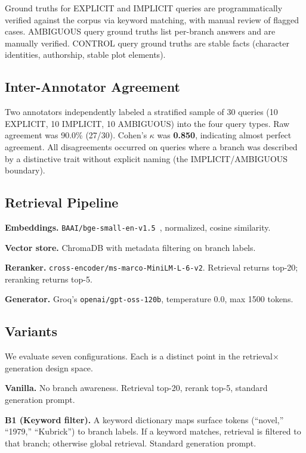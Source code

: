 \documentclass[conference]{IEEEtran}
\begin{document}
Ground truths for EXPLICIT and IMPLICIT queries are programmatically verified against the corpus via keyword matching, with manual review of flagged cases. AMBIGUOUS query ground truths list per-branch answers and are manually verified. CONTROL query ground truths are stable facts (character identities, authorship, stable plot elements).

\subsection{Inter-Annotator Agreement}

Two annotators independently labeled a stratified sample of 30 queries (10 EXPLICIT, 10 IMPLICIT, 10 AMBIGUOUS) into the four query types. Raw agreement was 90.0\% (27/30). Cohen's $\kappa$ was \textbf{0.850}, indicating almost perfect agreement. All disagreements occurred on queries where a branch was described by a distinctive trait without explicit naming (the IMPLICIT/AMBIGUOUS boundary).

\subsection{Retrieval Pipeline}

\textbf{Embeddings.} \texttt{BAAI/bge-small-en-v1.5}~\cite{bge}, normalized, cosine similarity.

\textbf{Vector store.} ChromaDB with metadata filtering on branch labels.

\textbf{Reranker.} \texttt{cross-encoder/ms-marco-MiniLM-L-6-v2}. Retrieval returns top-20; reranking returns top-5.

\textbf{Generator.} Groq's \texttt{openai/gpt-oss-120b}, temperature 0.0, max 1500 tokens.

\subsection{Variants}
\label{sec:variants}

We evaluate seven configurations. Each is a distinct point in the retrieval$\times$generation design space.

\textbf{Vanilla.} No branch awareness. Retrieval top-20, rerank top-5, standard generation prompt.

\textbf{B1 (Keyword filter).} A keyword dictionary maps surface tokens (``novel,'' ``1979,'' ``Kubrick'') to branch labels. If a keyword matches, retrieval is filtered to that branch; otherwise global retrieval. Standard generation prompt.
\end{document}
